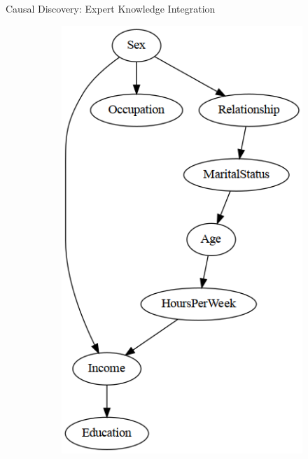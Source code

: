 \documentclass{beamer}
\begin{document}
\begin{frame}{Causal Discovery: Expert Knowledge Integration}
\begin{figure}
\begin{subfigure}{0.45 \textwidth}
			\includegraphics[scale=0.28]{imgs/adult_bic_start.png}
		\end{subfigure}
	\end{figure}
\end{frame}
\end{document}
